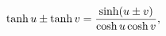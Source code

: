 \[\mathop{\tanh\/}\nolimits u\pm\mathop{\tanh\/}\nolimits v=\frac{\mathop{\sinh%
\/}\nolimits\!\left(u\pm v\right)}{\mathop{\cosh\/}\nolimits u\mathop{\cosh\/}%
\nolimits v},\]